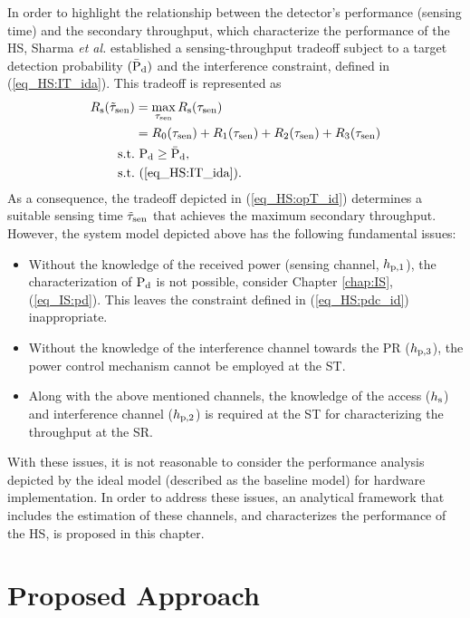 In order to highlight the relationship between the detector's performance (sensing time) and the secondary throughput, which characterize the performance of the HS, Sharma \textit{et al.} \cite{Sharma14} established a sensing-throughput tradeoff subject to a target detection probability $(\bar{\text{P}}_{\text{d}})$ and the interference constraint, defined in (\ref{eq_HS:IT_ida}). This tradeoff is represented as
\begin{align}
R_{\text{s}}(\tilde{\tau}_{\text{sen}}) &= \operatorname*{max}_{\tau_{\text{sen}}} R_{\text{s}}(\tau_{\text{sen}}) \label{eq_HS:opT_id}\\ 
\quad &= R_{\text{0}}(\tau_{\text{sen}}) + R_{\text{1}}(\tau_{\text{sen}}) + R_{\text{2}}(\tau_{\text{sen}}) + R_{\text{3}}(\tau_{\text{sen}}) \nonumber  \\
\text{s.t.} & \text{ } \text{P}_{\text{d}} \ge \bar{\text{P}}_{\text{d}}, \label{eq_HS:pdc_id} \\ 
\text{s.t.} & \text{ } (\ref{eq_HS:IT_ida}). \nonumber
\end{align}
As a consequence, the tradeoff depicted in (\ref{eq_HS:opT_id}) determines a suitable sensing time $\tilde{\tau}_{\text{sen}}$ that achieves the maximum secondary throughput.
However, the system model depicted above has the following fundamental issues:
\begin{itemize}
\item Without the knowledge of the received power (sensing channel, $h_{\text{p,1}}$), the characterization of $\text{P}_{\text{d}}$ is not possible, consider Chapter \ref{chap:IS}, (\ref{eq_IS:pd}). This leaves the constraint defined in (\ref{eq_HS:pdc_id}) inappropriate. 
\item Without the knowledge of the interference channel towards the PR ($h_{\text{p,3}}$), the power control mechanism cannot be employed at the ST.
\item Along with the above mentioned channels, the knowledge of the access ($h_{\text{s}}$) and interference channel ($h_{\text{p,2}}$) is required at the ST for characterizing the throughput at the SR. 
\end{itemize} 
With these issues, it is not reasonable to consider the performance analysis depicted by the ideal model (described as the baseline model) for hardware implementation. In order to address these issues, an analytical framework that includes the estimation of these channels, and characterizes the performance of the HS, is proposed in this chapter. 
\section{Proposed Approach} \label{sec_HS:pm}
